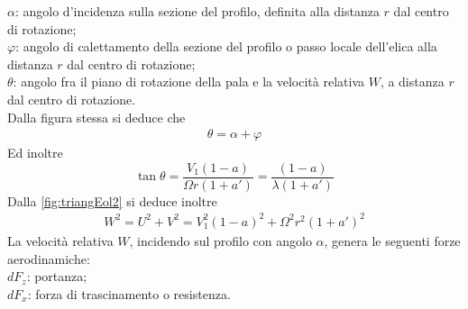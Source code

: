 $\alpha$: angolo d'incidenza sulla sezione del profilo, definita alla distanza $r$ dal centro di rotazione;\\
$\varphi$: angolo di calettamento della sezione del profilo o passo locale dell'elica alla distanza $r$ dal centro di rotazione;\\
$\theta$: angolo fra il piano di rotazione della pala e la velocità relativa $W$, a distanza $r$ dal centro di rotazione.\\[2mm]
Dalla figura stessa si deduce che 
\begin{align*}
\theta = \alpha + \varphi
\end{align*}
Ed inoltre
\begin{equation}\label{eq:tantheta}
\tan \theta = \frac{V_1 \left(1-a \right)}{\Omega r \left(1 + a' \right)} = \frac{\left( 1-a \right)}{\lambda \left( 1 + a' \right)}
\end{equation}
Dalla \ref{fig:triangEol2} si deduce inoltre
\begin{align*}
W^2 = U^2 + V^2 = V_1^2 \left(1-a \right)^2 + \Omega^2 r^2 \left( 1+ a' \right)^2
\end{align*}
La velocità relativa $W$, incidendo sul profilo con angolo $\alpha$, genera le seguenti forze aerodinamiche:\\
$dF_z$: portanza;\\
$dF_x$: forza di trascinamento o resistenza.\\[2mm]

